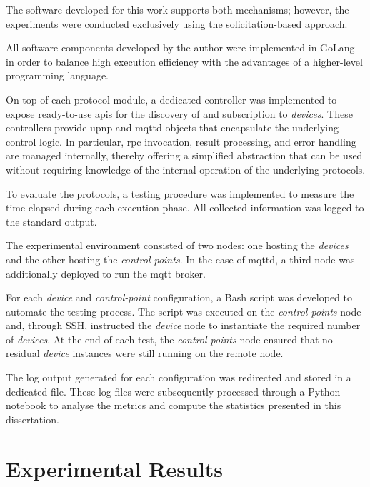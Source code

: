 \documentclass[lettersize,journal]{IEEEtran}
\begin{document}
The software developed for this work \cite{DaniDF_MQTT-Discovery_vs_UPnP} supports both mechanisms; however, the experiments were conducted exclusively using the solicitation-based approach.

All software components developed by the author \cite{DaniDF_MQTT-Discovery_vs_UPnP} were implemented in GoLang in order to balance high execution efficiency with the advantages of a higher-level programming language.

On top of each protocol module, a dedicated controller was implemented to expose ready-to-use \gls{api}s for the discovery of and subscription to \textit{devices}. These controllers provide \gls{upnp} and \gls{mqttd} objects that encapsulate the underlying control logic. In particular, \gls{rpc} invocation, result processing, and error handling are managed internally, thereby offering a simplified abstraction that can be used without requiring knowledge of the internal operation of the underlying protocols.

To evaluate the protocols, a testing procedure was implemented to measure the time elapsed during each execution phase. All collected information was logged to the standard output.

The experimental environment consisted of two nodes: one hosting the \textit{devices} and the other hosting the \textit{control-points}. In the case of \gls{mqttd}, a third node was additionally deployed to run the \gls{mqtt} broker.

For each \textit{device} and \textit{control-point} configuration, a Bash script was developed to automate the testing process. The script was executed on the \textit{control-points} node and, through SSH, instructed the \textit{device} node to instantiate the required number of \textit{devices}. At the end of each test, the \textit{control-points} node ensured that no residual \textit{device} instances were still running on the remote node.

The log output generated for each configuration was redirected and stored in a dedicated file. These log files were subsequently processed through a Python notebook to analyse the metrics and compute the statistics presented in this dissertation.

\section{Experimental Results}
\label{sec_experimental_results}
\end{document}
